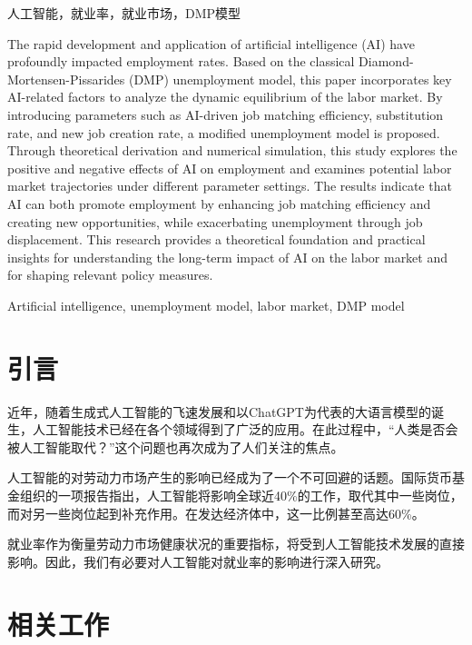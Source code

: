 \documentclass{article}
\begin{document}
人工智能，就业率，就业市场，DMP模型

\songti
\vspace{2cm}

%
The rapid development and application of artificial intelligence (AI) have profoundly impacted employment rates. Based on the classical Diamond-Mortensen-Pissarides (DMP) unemployment model, this paper incorporates key AI-related factors to analyze the dynamic equilibrium of the labor market. By introducing parameters such as AI-driven job matching efficiency, substitution rate, and new job creation rate, a modified unemployment model is proposed. Through theoretical derivation and numerical simulation, this study explores the positive and negative effects of AI on employment and examines potential labor market trajectories under different parameter settings. The results indicate that AI can both promote employment by enhancing job matching efficiency and creating new opportunities, while exacerbating unemployment through job displacement. This research provides a theoretical foundation and practical insights for understanding the long-term impact of AI on the labor market and for shaping relevant policy measures.

\bigskip
{}%
Artificial intelligence, unemployment model, labor market, DMP model

\newpage
{}
\setcounter{page}{1}

\section{引言}

近年，随着生成式人工智能的飞速发展和以ChatGPT为代表的大语言模型的诞生，人工智能技术已经在各个领域得到了广泛的应用。在此过程中，``人类是否会被人工智能取代？''这个问题也再次成为了人们关注的焦点。

人工智能的对劳动力市场产生的影响已经成为了一个不可回避的话题。国际货币基金组织的一项报告\cite{imf2024ai}指出，人工智能将影响全球近40\%的工作，取代其中一些岗位，而对另一些岗位起到补充作用。在发达经济体中，这一比例甚至高达60\%。

就业率作为衡量劳动力市场健康状况的重要指标，将受到人工智能技术发展的直接影响。因此，我们有必要对人工智能对就业率的影响进行深入研究。

\section{相关工作}
\end{document}
